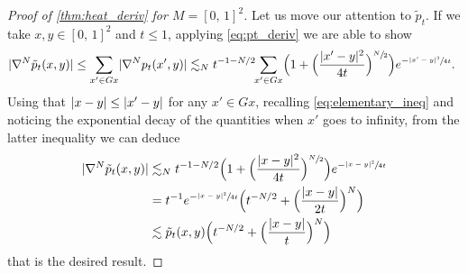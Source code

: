 \documentclass[10pt]{amsart}
\theoremstyle{plain}
\theoremstyle{definition}
\numberwithin{equation}{section}
\newcommand{\cc}[2]{\ensuremath{\left[#1,\,#2\right]}}
\newcommand{\fullstop}{\ensuremath{\text{. }}}
\DeclarePairedDelimiter\abs{\lvert}{\rvert}
\begin{document}
\begin{proof}[Proof of \cref{thm:heat_deriv} for $M=\cc01^2$]
Let us move our attention to $\tilde p_t$.
If we take $x,y\in\cc01^2$ and $t\le 1$, applying \cref{eq:pt_deriv} we are able to show
\begin{equation*}
\abs{\nabla^N \tilde p_t(x, y)} \le \sum_{x'\in Gx} \abs{\nabla^N p_t(x', y)}
\lesssim_N t^{-1-N/2}\hspace*{-3pt}\sum_{x'\in Gx} \Bigl(1+ \Bigl(\frac{\abs{x'-y}^2}{4t}\Bigr)^{\sfrac N2}\Bigr)
e^{-\sfrac{\abs{x'-y}^2}{4t}} \fullstop
\end{equation*}
Using that $\abs{x-y}\le \abs{x'-y}$ for any $x'\in Gx$, recalling \cref{eq:elementary_ineq} and
noticing the exponential decay of the quantities when $x'$ goes to infinity, from the latter inequality
we can deduce
\begin{align*}
\abs{\nabla^N \tilde p_t(x, y)}
&\lesssim_N t^{-1-N/2}\Bigl(1+ \Bigl(\frac{\abs{x-y}^2}{4t}\Bigr)^{\sfrac N2}\Bigr)
		e^{-\sfrac{\abs{x-y}^2}{4t}} \\
&= t^{-1}e^{-\sfrac{\abs{x-y}^2}{4t}}
		\Bigl(t^{-N/2}+\Bigl(\frac{\abs{x-y}}{2t}\Bigr)^N\Bigr) \\
&\lesssim \tilde p_t(x, y)
	 \Bigl(t^{-N/2}+\Bigl(\frac{\abs{x-y}}t\Bigr)^N\Bigr)
\end{align*}
that is the desired result.
\end{proof}
\end{document}
